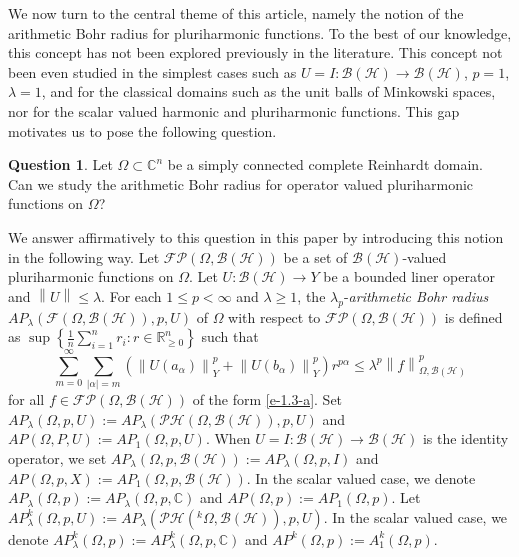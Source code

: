 \documentclass[a4paper,11pt, reqno]{amsart}
\theoremstyle{definition}
\newtheorem{qsn}{Question} [section]
\newcommand{\norm}[1]{\left\lVert#1\right\rVert}
\begin{document}
We now turn to the central theme of this article, namely the notion of the arithmetic Bohr radius for pluriharmonic functions. To the best of our knowledge, this concept has not been explored previously in the literature. This concept not been even studied in the simplest cases such as $U=I:\mathcal{B}(\mathcal{H})\rightarrow \mathcal{B}(\mathcal{H})$, $p=1$, $\lambda=1$, and for the classical domains such as the unit balls of Minkowski spaces, nor for the scalar valued harmonic and pluriharmonic functions. This gap motivates us to pose the following question. 
\begin{qsn} \label{qsn-1.2}
	Let $\Omega \subset \mathbb{C}^n$ be a simply connected complete Reinhardt domain. Can we study the arithmetic Bohr radius for operator valued pluriharmonic functions on $\Omega$?
\end{qsn}
We answer affirmatively to this question in this paper by introducing this notion in the following way.
Let $\mathcal{FP}(\Omega, \mathcal{B}(\mathcal{H}))$ be a set of $\mathcal{B}(\mathcal{H})$-valued pluriharmonic functions on $\Omega$. Let $U:\mathcal{B}(\mathcal{H})\rightarrow Y$ be a bounded liner operator and $\norm{U} \leq \lambda$.
	For each $1\leq p<\infty$ and $\lambda\geq 1$, the $\lambda_{p}$-\textit{arithmetic Bohr radius} $AP_{\lambda}(\mathcal{F}(\Omega, \mathcal{B}(\mathcal{H})), p, U)$ of $\Omega$ with respect to $\mathcal{FP}(\Omega, \mathcal{B}(\mathcal{H}))$ is defined as $\sup\left\{\frac{1}{n}\sum_{i=1}^{n}r_i:r\in \mathbb{R}^{n}_{\geq 0}\right\}$ such that
	\begin{equation*} 
\sum_{m=0}^{\infty} \sum_{|\alpha|=m} (\norm{U(a_{\alpha})}^p_{Y} + \norm{U(b_{\alpha})}^p_{Y})r^{p \alpha} \leq \lambda^p\norm{f}^p_{\Omega,\mathcal{B}(\mathcal{H})}
	\end{equation*}
for all $f\in \mathcal{FP}(\Omega, \mathcal{B}(\mathcal{H}))$ of the form \eqref{e-1.3-a}.
	Set $AP_\lambda(\Omega,p,U):=AP_\lambda(\mathcal{PH}(\Omega,\mathcal{B}(\mathcal{H})),p,U)$ and $AP(\Omega,P,U):=AP_1(\Omega,p,U)$. When $U=I:\mathcal{B}(\mathcal{H})\rightarrow \mathcal{B}(\mathcal{H})$ is the identity operator, we set $AP_{\lambda}(\Omega, p,\mathcal{B}(\mathcal{H})):=AP_{\lambda}(\Omega, p,I)$ and $AP(\Omega, p,X):=AP_{1}(\Omega, p,\mathcal{B}(\mathcal{H}))$. In the scalar valued case, we denote $AP_{\lambda}(\Omega, p):=AP_{\lambda}(\Omega, p,\mathbb{C})$ and $AP(\Omega,p):=AP_1(\Omega,p)$.  Let $AP^k_\lambda(\Omega,p,U):=AP_\lambda(\mathcal{PH}(^k\Omega,\mathcal{B}(\mathcal{H})),p,U)$. In the scalar valued case, we denote $AP^k_{\lambda}(\Omega, p):=AP^k_{\lambda}(\Omega, p,\mathbb{C})$ and $AP^k(\Omega,p):=A^k_1(\Omega,p)$. 
	
\end{document}
